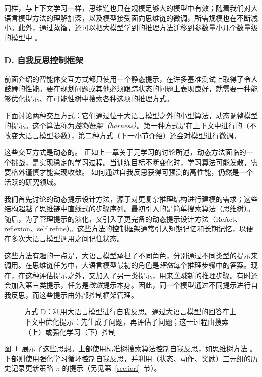 同样，与上下文学习一样，思维链也只在规模足够大的模型中有效；随着我们对大语言模型方法的理解加深，以及模型接受面向思维链的微调，所需规模也在不断减小。此外，通过蒸馏，还可以把大模型学到的推理方法迁移到参数量小几个数量级的模型中 \citep{li-etal-2023-symbolic}。




\subsubsection{D. 自我反思控制框架}
前面介绍的智能体交互方式都只使用一个静态提示，在许多基准测试上取得了令人鼓舞的性能。要在规划问题或其他必须跟踪状态的问题上表现良好，就需要一种能够优化提示、在可能性树中搜索各种选项的推理方式。

下面讨论两种交互方式：它们通过位于大语言模型之外的小型算法，动态调整模型的提示。这个算法称为{\em 控制框架（harness）}。第一种方式是在上下文中进行的（不改变大语言模型参数），第二种方式（下一小节介绍）还会对模型进行微调。

这些交互方式是动态的。
正如上一章关于元学习的讨论所述，动态方法面临的一个挑战，是实现稳定的学习过程。当训练目标不断变化时，学习算法可能发散，需要格外谨慎才能实现收敛。
如何通过自我反思获得可预测的高性能，仍然是一个活跃的研究领域。

我们首先讨论的动态提示设计方法，源于对更复杂推理结构进行建模的需求；这些结构超越了思维链中直线式的步骤序列。最初引入的是简单搜索算法（思维树）。随后，为了管理提示的演化，又引入了更完备的动态提示设计方法（ReAct、reflexion、self refine）。这些方法的控制框架通常引入短期记忆和长期记忆，以便在多次大语言模型调用之间记住状态。

这些方法有趣的一点是，大语言模型承担了不同角色，分别通过不同类型的提示来调用。在思维链任务中，大语言模型最初的角色是{\em 评估}每个推理步骤中的答案。现在，在这种评估提示之外，又加入了另一类提示，用来{\em 生成}新的推理步骤。有时还会加入第三类提示，任务是{\em 改进}提示本身。因此，同一个模型通过不同提示进行自我反思，而这些提示由外部控制框架管理。

\begin{figure}
  \begin{center}
    
    \caption{方式 D：利用大语言模型进行自我反思。通过大语言模型的回答在上下文中优化提示：先生成子问题，再评估子问题；这一过程由搜索（上）或强化学习（下）控制}\label{fig:rlD}
  \end{center}
\end{figure}


图~\ref{fig:rlD}~展示了这些思想。上部使用标准树搜索算法控制自我反思，如思维树方法 \citep{yao2024tree}。下部则使用强化学习循环控制自我反思，并利用（状态、动作、奖励）三元组的历史记录更新策略 $\pi$ 的提示（另见第~\ref{sec:icrl}~节）。





